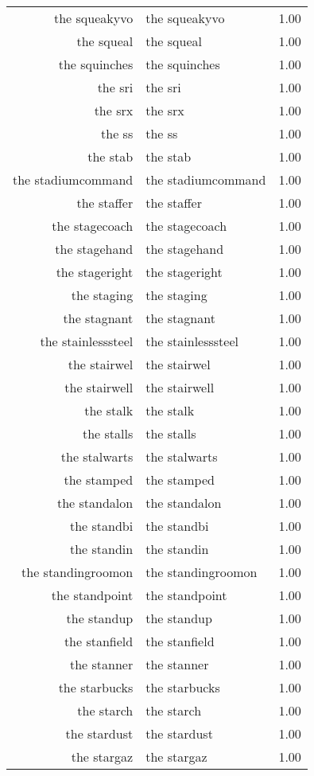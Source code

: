 \begin{table}[ht]
\begin{tabular}{rlr}
  the squeakyvo & the squeakyvo & 1.00 \\ 
  the squeal & the squeal & 1.00 \\ 
  the squinches & the squinches & 1.00 \\ 
  the sri & the sri & 1.00 \\ 
  the srx & the srx & 1.00 \\ 
  the ss & the ss & 1.00 \\ 
  the stab & the stab & 1.00 \\ 
  the stadiumcommand & the stadiumcommand & 1.00 \\ 
  the staffer & the staffer & 1.00 \\ 
  the stagecoach & the stagecoach & 1.00 \\ 
  the stagehand & the stagehand & 1.00 \\ 
  the stageright & the stageright & 1.00 \\ 
  the staging & the staging & 1.00 \\ 
  the stagnant & the stagnant & 1.00 \\ 
  the stainlesssteel & the stainlesssteel & 1.00 \\ 
  the stairwel & the stairwel & 1.00 \\ 
  the stairwell & the stairwell & 1.00 \\ 
  the stalk & the stalk & 1.00 \\ 
  the stalls & the stalls & 1.00 \\ 
  the stalwarts & the stalwarts & 1.00 \\ 
  the stamped & the stamped & 1.00 \\ 
  the standalon & the standalon & 1.00 \\ 
  the standbi & the standbi & 1.00 \\ 
  the standin & the standin & 1.00 \\ 
  the standingroomon & the standingroomon & 1.00 \\ 
  the standpoint & the standpoint & 1.00 \\ 
  the standup & the standup & 1.00 \\ 
  the stanfield & the stanfield & 1.00 \\ 
  the stanner & the stanner & 1.00 \\ 
  the starbucks & the starbucks & 1.00 \\ 
  the starch & the starch & 1.00 \\ 
  the stardust & the stardust & 1.00 \\ 
  the stargaz & the stargaz & 1.00 \\ 

\end{tabular}
\end{table}
